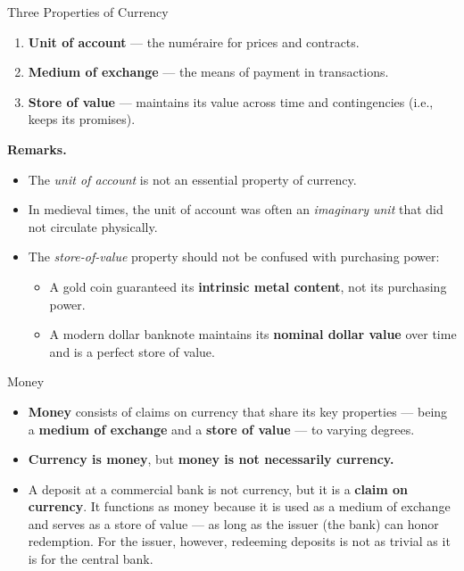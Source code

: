 \documentclass[11pt,aspectratio=169]{beamer}
\begin{document}
\begin{frame}{Three Properties of Currency}
\small
\begin{enumerate}
  \item \textbf{Unit of account} — the numéraire for prices and contracts.
  \item \textbf{Medium of exchange} — the means of payment in transactions.
  \item \textbf{Store of value} — maintains its value across time and contingencies (i.e., keeps its promises).
\end{enumerate}

\vspace{0.6em}
\textbf{Remarks.}
\begin{itemize}
  \item The \emph{unit of account} is not an essential property of currency.
  \item In medieval times, the unit of account was often an \emph{imaginary unit} that did not circulate physically.
  \item The \emph{store-of-value} property should not be confused with purchasing power:
  \begin{itemize}
      \item A gold coin guaranteed its \textbf{intrinsic metal content}, not its purchasing power.  
      \item A modern dollar banknote maintains its \textbf{nominal dollar value} over time and is a perfect store of value.
  \end{itemize}
\end{itemize}
\end{frame}

\begin{frame}{Money}
\small
\begin{itemize}
  \item \textbf{Money} consists of claims on currency that share its key properties — being a \textbf{medium of exchange} and a \textbf{store of value} — to varying degrees.
  
  \vspace{0.3cm}
  \item \textbf{Currency is money}, but \textbf{money is not necessarily currency.}
  
  \vspace{0.3cm}
  \item A deposit at a commercial bank is not currency, but it is a \textbf{claim on currency}.  
  It functions as money because it is used as a medium of exchange and serves as a store of value — as long as the issuer (the bank) can honor redemption.  
  For the issuer, however, redeeming deposits is not as trivial as it is for the central bank.
\end{itemize}

\vspace{0.4em}
\end{frame}
\end{document}
